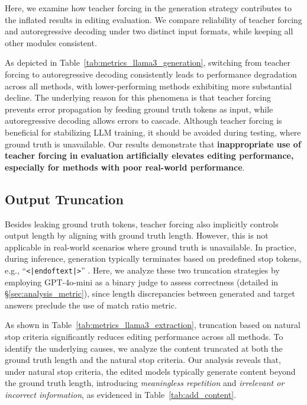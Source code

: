 Here, we examine how teacher forcing in the generation strategy contributes to the inflated results in editing evaluation. 
We compare reliability of teacher forcing and autoregressive decoding under two distinct input formats, while keeping all other modules consistent.


As depicted in Table~\ref{tab:metrics_llama3_generation}, switching from teacher forcing to autoregressive decoding consistently leads to performance degradation across all methods, with lower-performing methods exhibiting more substantial decline.
The underlying reason for this phenomena is that teacher forcing prevents error propagation by feeding ground truth tokens as input, while autoregressive decoding allows errors to cascade.
Although teacher forcing is beneficial for stabilizing LLM training, it should be avoided during testing, where ground truth is unavailable. 
Our results demonstrate that \textbf{inappropriate use of teacher forcing in evaluation artificially elevates editing performance, especially for methods with poor real-world performance}.


\subsection{Output Truncation}
\label{sec:answer_trunc}












Besides leaking ground truth tokens, teacher forcing also implicitly controls output length by aligning with ground truth length.
However, this is not applicable in real-world scenarios where ground truth is unavailable.
In practice, during inference, generation typically terminates based on predefined stop tokens, e.g., ``\texttt{<|endoftext|>}'' \cite{eval-harness}.
Here, we analyze these two truncation strategies by employing GPT-4o-mini as a binary judge to assess correctness (detailed in \S\ref{sec:analysis_metric}), since length discrepancies between generated and target answers preclude the use of match ratio metric.

As shown in Table~\ref{tab:metrics_llama3_extraction}, truncation based on natural stop criteria significantly reduces editing performance across all methods.
To identify the underlying causes, we analyze the content truncated at both the ground truth length and the natural stop criteria. 
Our analysis reveals that, under natural stop criteria, the edited models typically generate content beyond the ground truth length, introducing \textit{meaningless repetition} and \textit{irrelevant or incorrect information}, as evidenced in Table~\ref{tab:add_content}.


